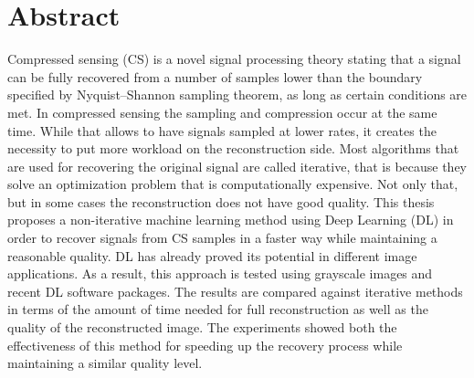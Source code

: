 

\cleardoublepage
\chapter*{Abstract}
Compressed sensing (CS) is a novel signal processing theory stating that a signal can be fully recovered from a number of samples lower than the boundary specified by Nyquist–Shannon sampling theorem, as long as certain conditions are met. In compressed sensing the sampling and compression occur at the same time. While that allows to have signals sampled at lower rates, it creates the necessity to put more workload on the reconstruction side. Most algorithms that are used for recovering the original signal are called iterative, that is because they solve an optimization problem that is computationally expensive. Not only that, but in some cases the reconstruction does not have good quality. This thesis proposes a non-iterative machine learning method using Deep Learning (DL) in order to recover signals from CS samples in a faster way while maintaining a reasonable quality. DL has already proved its potential in different image applications. As a result, this approach is tested using grayscale images and recent DL software packages. The results are compared against iterative methods in terms of the amount of time needed for full reconstruction as well as the quality of the reconstructed image. The experiments showed both the effectiveness of this method for speeding up the recovery process while maintaining a similar quality level.  
\vskip0.5cm








